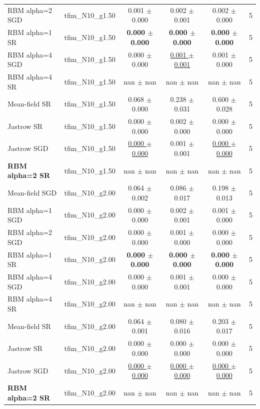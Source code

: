 \begin{tabular}{llcccc}
RBM alpha=2 SGD & tfim\_N10\_g1.50 & 0.001 $\pm$ 0.000 & 0.002 $\pm$ 0.001 & 0.002 $\pm$ 0.000 & 5 \\
RBM alpha=1 SR & tfim\_N10\_g1.50 & \textbf{0.000 $\pm$ 0.000} & \textbf{0.000 $\pm$ 0.000} & \textbf{0.000 $\pm$ 0.000} & 5 \\
RBM alpha=4 SGD & tfim\_N10\_g1.50 & 0.000 $\pm$ 0.000 & \underline{0.001 $\pm$ 0.001} & 0.001 $\pm$ 0.000 & 5 \\
RBM alpha=4 SR & tfim\_N10\_g1.50 & nan $\pm$ nan & nan $\pm$ nan & nan $\pm$ nan & 5 \\
Mean-field SR & tfim\_N10\_g1.50 & 0.068 $\pm$ 0.000 & 0.238 $\pm$ 0.031 & 0.600 $\pm$ 0.028 & 5 \\
Jastrow SR & tfim\_N10\_g1.50 & 0.000 $\pm$ 0.000 & 0.002 $\pm$ 0.000 & 0.000 $\pm$ 0.000 & 5 \\
Jastrow SGD & tfim\_N10\_g1.50 & \underline{0.000 $\pm$ 0.000} & 0.001 $\pm$ 0.001 & \underline{0.000 $\pm$ 0.000} & 5 \\
\textbf{RBM alpha=2 SR} & tfim\_N10\_g1.50 & nan $\pm$ nan & nan $\pm$ nan & nan $\pm$ nan & 5 \\
\midrule
Mean-field SGD & tfim\_N10\_g2.00 & 0.064 $\pm$ 0.002 & 0.086 $\pm$ 0.017 & 0.198 $\pm$ 0.013 & 5 \\
RBM alpha=1 SGD & tfim\_N10\_g2.00 & 0.000 $\pm$ 0.000 & 0.002 $\pm$ 0.001 & 0.001 $\pm$ 0.000 & 5 \\
RBM alpha=2 SGD & tfim\_N10\_g2.00 & 0.000 $\pm$ 0.000 & 0.001 $\pm$ 0.000 & 0.000 $\pm$ 0.000 & 5 \\
RBM alpha=1 SR & tfim\_N10\_g2.00 & \textbf{0.000 $\pm$ 0.000} & \textbf{0.000 $\pm$ 0.000} & \textbf{0.000 $\pm$ 0.000} & 5 \\
RBM alpha=4 SGD & tfim\_N10\_g2.00 & 0.000 $\pm$ 0.000 & 0.001 $\pm$ 0.001 & 0.000 $\pm$ 0.000 & 5 \\
RBM alpha=4 SR & tfim\_N10\_g2.00 & nan $\pm$ nan & nan $\pm$ nan & nan $\pm$ nan & 5 \\
Mean-field SR & tfim\_N10\_g2.00 & 0.064 $\pm$ 0.001 & 0.080 $\pm$ 0.016 & 0.203 $\pm$ 0.017 & 5 \\
Jastrow SR & tfim\_N10\_g2.00 & 0.000 $\pm$ 0.000 & 0.000 $\pm$ 0.000 & 0.000 $\pm$ 0.000 & 5 \\
Jastrow SGD & tfim\_N10\_g2.00 & \underline{0.000 $\pm$ 0.000} & \underline{0.000 $\pm$ 0.000} & \underline{0.000 $\pm$ 0.000} & 5 \\
\textbf{RBM alpha=2 SR} & tfim\_N10\_g2.00 & nan $\pm$ nan & nan $\pm$ nan & nan $\pm$ nan & 5 \\

\end{tabular}
